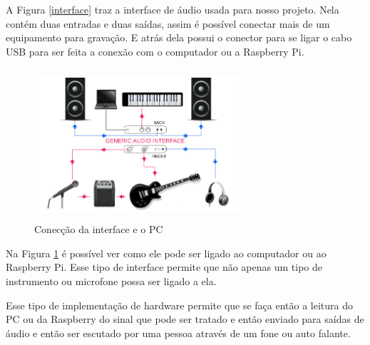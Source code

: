 \documentclass[conference]{IEEEtran}
\begin{document}
A Figura \ref{interface} traz a interface de áudio usada para nosso projeto. Nela contém duas entradas e duas saídas, assim é possível conectar mais de um equipamento para gravação. E atrás dela possui o conector para se ligar o cabo USB para ser feita a conexão com o computador ou a Raspberry Pi.

\begin{figure}[!htb]
\centering
\includegraphics[width=3.0in, height=2.2in]{Imagens/conection}
\caption{Conecção da interface e o PC} 
\label{conection}
\end{figure}

Na Figura \ref{conection} é possível ver como ele pode ser ligado ao computador ou ao Raspberry Pi. Esse tipo de interface permite que não apenas um tipo de instrumento ou microfone possa ser ligado a ela.

Esse tipo de implementação de hardware permite que se faça então a leitura do PC ou da Raspberry do sinal que pode ser tratado e então enviado para saídas de áudio e então ser escutado por uma pessoa através de um fone ou auto falante.






\end{document}
